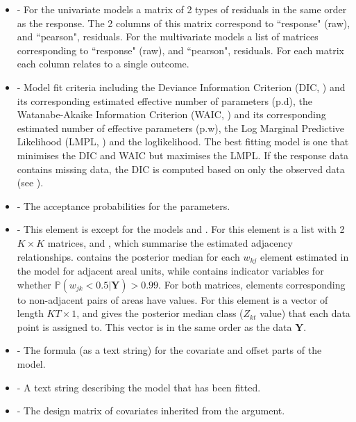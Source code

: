 \documentclass[article, nojss]{jss}
\begin{document}
\begin{itemize}
\item {} - For the univariate models a matrix of 2 types of residuals in the same order as the response. The 2 columns of this matrix correspond to ``response" (raw), and ``pearson", residuals. For the multivariate models a list of matrices corresponding to  ``response" (raw), and ``pearson", residuals. For each matrix each column relates to a single outcome. 

\item {} - Model fit criteria including the Deviance Information Criterion (DIC, \citealp{spiegelhalter2002}) and its corresponding estimated effective number of parameters (p.d), the Watanabe-Akaike Information Criterion (WAIC, \citealp{watanabe2010}) and its corresponding estimated number of effective parameters (p.w), the Log Marginal Predictive Likelihood (LMPL, \citealp{congdon2005}) and the loglikelihood. The best fitting model is one that minimises the DIC and WAIC but maximises the LMPL. If the response data contains missing data, the DIC is computed based on only the observed data (see \cite{celeux2006}).

\item {} - The acceptance probabilities for the parameters.

\item {} - This element is  except for the models  and . For  this element is a list with 2 $K \times K$ matrices,  and , which summarise the estimated adjacency relationships.  contains the posterior median for each $w_{kj}$ element estimated in the model for adjacent areal units, while  contains indicator variables for whether $\mathbb{P}(w_{jk} < 0.5|\mathbf{Y})>0.99$. For both matrices, elements corresponding to non-adjacent pairs of areas have  values. For  this element is a vector of length $KT\times 1$, and gives the posterior median class ($Z_{kt}$ value) that each data point is assigned to. This vector is in the same order as the data $\mathbf{Y}$.
        
\item {} - The formula (as a text string) for the covariate and offset parts of the model.

\item {} - A text string describing the model that has been fitted.

\item {} - The design matrix of covariates inherited from the  argument.
\end{itemize}
\end{document}
